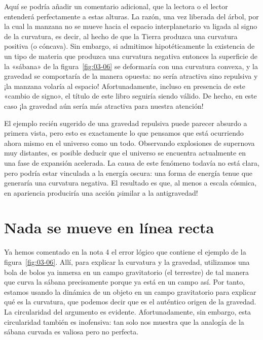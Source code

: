 Aquí se podría añadir un comentario adicional, que la lectora o el lector entenderá
perfectamente a estas alturas. La razón, una vez liberada del árbol, por la cual la manzana no
se mueve hacia el espacio interplanetario va ligada al signo de la curvatura, es decir, al
hecho de que la Tierra produzca una curvatura positiva (o cóncava). Sin embargo, si admitimos
hipotéticamente la existencia de un tipo de materia que produzca una curvatura negativa
entonces la superficie de la «sábana» de la figura~\ref{fig:03-06} se deformaría con una
curvatura convexa, y la gravedad se comportaría de la manera opuesta: no sería atractiva sino
repulsiva y ¡la manzana volaría al espacio! Afortunadamente, incluso en presencia de este
«cambio de signo», el título de este libro seguiría siendo válido. De hecho, en este caso ¡la
gravedad aún sería más atractiva para nuestra atención!

El ejemplo recién sugerido de una gravedad repulsiva puede parecer absurdo a primera vista,
pero esto es exactamente lo que pensamos que está ocurriendo ahora mismo en el universo como un
todo. Observando explosiones de supernova muy distantes, es posible deducir que el universo se
encuentra actualmente en una fase de expansión acelerada. La causa de este fenómeno todavía no
está clara, pero podría estar vinculada a la energía oscura: una forma de energía tenue que
generaría una curvatura negativa. El resultado es que, al menos a escala cósmica, en apariencia
produciría una acción ¡similar a la antigravedad!

\section{Nada se mueve en línea recta}\label{sec:03-geodesics}

Ya hemos comentado en la nota 4 el error lógico que contiene el ejemplo de la
figura~\ref{fig:03-06}. Allí, para explicar la curvatura y la gravedad, utilizamos una bola de
bolos ya inmersa en un campo gravitatorio (el terrestre) de tal manera que curva la sábana
precisamente porque ya está en un campo así. Por tanto, estamos usando la dinámica de un objeto
en un campo gravitatorio para explicar qué es la curvatura, que podemos decir que es el
auténtico origen de la gravedad. La circularidad del argumento es evidente. Afortunadamente,
sin embargo, esta circularidad también es inofensiva: tan solo nos muestra que la analogía de
la sábana curvada es valiosa pero no perfecta.

